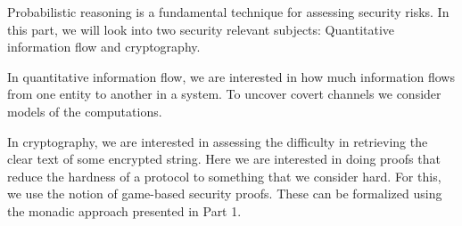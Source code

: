 Probabilistic reasoning is a fundamental technique for assessing security risks.
In this part, we will look into two security relevant subjects: Quantitative
information flow and cryptography.

In quantitative information flow, we are interested in how much
information flows from one entity to another in a system. To uncover
covert channels we consider models of the computations.

In cryptography, we are interested in assessing the difficulty in retrieving
the clear text of some encrypted string. Here we are interested in doing
proofs that reduce the hardness of a protocol to something that we
consider hard. For this, we use the notion of game-based security proofs.
These can be formalized using the monadic approach presented in Part 1.